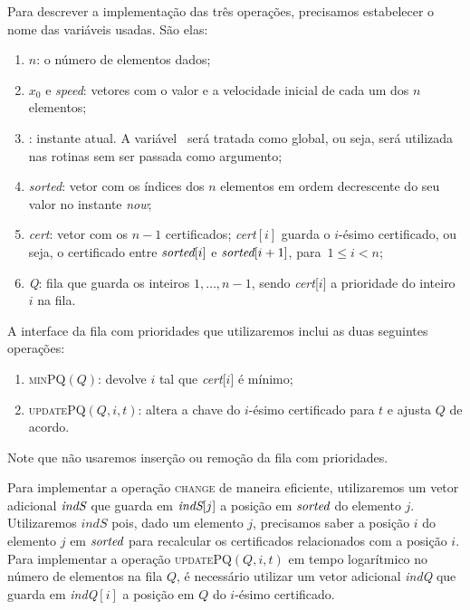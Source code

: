Para descrever a implementação das três operações, precisamos
estabelecer o nome das variáveis usadas.
São elas:
\begin{enumerate}
    \item $n$: o número de elementos dados;
    \item $x_0$ e \textit{speed}: vetores com o valor e a velocidade
    inicial de cada um dos $n$ elementos;
    \item \now: instante atual.
    A variável \now\ será tratada como
    global, ou seja, será utilizada nas rotinas sem ser passada como
    argumento;
    \item \textit{sorted}: vetor com os índices dos $n$ elementos em
    ordem decrescente do seu valor no instante \textit{now};
    \item \textit{cert}: vetor com os $n-1$ certificados;
    \textit{cert}$[i]$ guarda o $i$-ésimo certificado, ou seja, o certificado
    entre $\textit{sorted}[i]$ e ${\textit{sorted}[i+1]}$, para~$1\leq i < n$;
    \item \textit{Q}: fila que guarda os inteiros $1, \ldots, n-1$,
    sendo \textit{cert}[$i$] a prioridade do inteiro $i$ na fila.
\end{enumerate}



A interface da fila com prioridades que utilizaremos inclui as duas
seguintes operações:
\begin{enumerate}
    \item \textsc{minPQ}$(Q)$: devolve $i$ tal que
    \textit{cert}[$i$] é mínimo;
    \item \textsc{updatePQ}$(Q, i, t)$: altera a chave do
    $i$-ésimo certificado para $t$ e ajusta $Q$ de acordo.
\end{enumerate}

Note que não usaremos inserção ou remoção da fila com prioridades.

Para implementar a operação \textsc{change} de maneira eficiente, utilizaremos um vetor adicional
$\textit{indS}$ que guarda em $\textit{indS}[j]$ a posição em $\textit{sorted}$ do elemento $j$.
Utilizaremos $\textit{indS}$ pois, dado um elemento $j$, precisamos saber a posição $i$ do
elemento $j$ em $\textit{sorted}$ para recalcular os certificados relacionados com a posição $i$.
Para implementar a operação \textsc{updatePQ}$(Q, i, t)$ em tempo logarítmico no número de
elementos na fila $Q$, é necessário utilizar um vetor adicional \textit{indQ} que guarda em
\textit{indQ}$[i]$ a posição em $Q$ do $i$-ésimo certificado.

